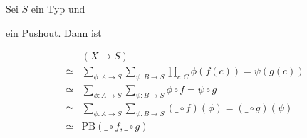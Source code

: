 \begin{lemma}
  Sei $S$ ein Typ und
  \begin{center}
  \end{center}
  ein Pushout. Dann ist
  \begin{center}
  \end{center}
\end{lemma}
\begin{beweis}
  \begin{align*}
    &(X\to S) \\
    \simeq &\sum_{\phi:A\to S}\sum_{\psi:B\to S}\prod_{c:C}\phi(f(c))=\psi(g(c)) \\
    \simeq &\sum_{\phi:A\to S}\sum_{\psi:B\to S}\phi \circ f=\psi \circ g \\
    \simeq &\sum_{\phi:A\to S}\sum_{\psi:B\to S}(\_\circ f)(\phi)=(\_ \circ g)(\psi) \\
    \simeq &\mathrm{PB}(\_\circ f,\_ \circ g)
  \end{align*}
\end{beweis}

